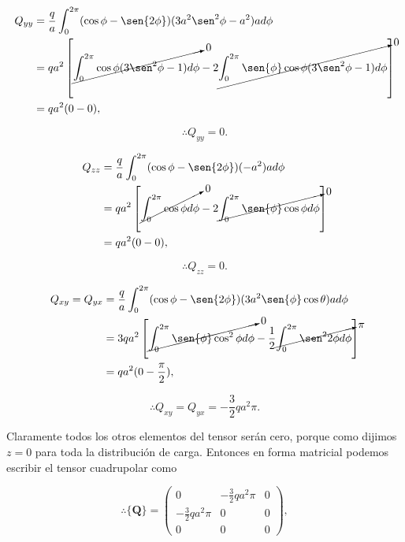 \documentclass[a4paper,11pt]{article}
\numberwithin{equation}{section}
\begin{document}
\begin{align*}
 Q_{yy} &= \frac{q}{a}\int_0^{2\pi} (\cos{\phi} - \sen{2\phi})(3a^2\sen^2{\phi} - 
 a^2)ad\phi \\
 &= qa^2\left[\cancelto{0}{\int_0^{2\pi}\cos{\phi}(3\sen^2{\phi} - 1)d\phi} - 
 2 \cancelto{0}{\int_0^{2\pi} \sen{\phi} \cos{\phi} (3\sen^2{\phi} - 1)d\phi}\right] \\
 &= qa^2 ( 0 - 0),
\end{align*}

\begin{equation}
 \therefore Q_{yy} = 0.
\end{equation}

\begin{align*}
 Q_{zz} &= \frac{q}{a}\int_0^{2\pi} (\cos{\phi} - \sen{2\phi})(-a^2)ad\phi \\
 &= qa^2\left[\cancelto{0}{\int_0^{2\pi}\cos{\phi}d\phi} - 
 2\cancelto{0}{\int_0^{2\pi}\sen{\phi}\cos{\phi}d\phi} \right] \\
 &= qa^2(0 - 0),
\end{align*}

\begin{equation}
 \therefore Q_{zz} = 0.
\end{equation}

\begin{align*}
 Q_{xy} = Q_{yx} &= \frac{q}{a}\int_0^{2\pi} (\cos{\phi} - \sen{2\phi})(3a^2\sen{\phi}\cos{\theta})ad\phi \\
 &= 3qa^2\left[\cancelto{0}{\int_0^{2\pi}\sen{\phi}\cos^2{\phi}d\phi} - 
 \frac{1}{2} \cancelto{\pi}{\int_0^{2\pi} \sen^2{2\phi}d\phi}\right] \\
 &= qa^2 ( 0 - \frac{\pi}{2}),
\end{align*}

\begin{equation}
 \therefore Q_{xy} = Q_{yx} = -\frac{3}{2}qa^2\pi.
\end{equation}

Claramente todos los otros elementos del tensor serán cero, porque como dijimos 
$z=0$ para toda la distribución de carga. Entonces en forma matricial podemos 
escribir el tensor cuadrupolar como 

\begin{equation}
 \therefore \{ \mathbf{Q} \} = \begin{pmatrix}
                     0 & -\frac{3}{2}qa^2\pi & 0 \\
                     -\frac{3}{2}qa^2\pi & 0 & 0 \\
                     0 & 0 & 0
                    \end{pmatrix},
\end{equation}
\end{document}
